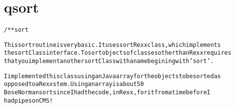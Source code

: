 \section{qsort}
\begin{shaded}
\begin{alltt}
/** sort

This sort routine is very basic.  It uses sortRexx class, which implements
the sortClass interface.  To sort objects of classes other than Rexx requires
that you implement another sortClass with a name begining with 'sort'.

I implemented this class using an Java array for the objects to be sorted as
opposed to a Rexx stem.  Using an array is about 50% faster.  I choose a quick/
Bose Norman sort since I had the code, in Rexx, for it from a time before I
had pipes on CMS!

\end{alltt}
\end{shaded}
